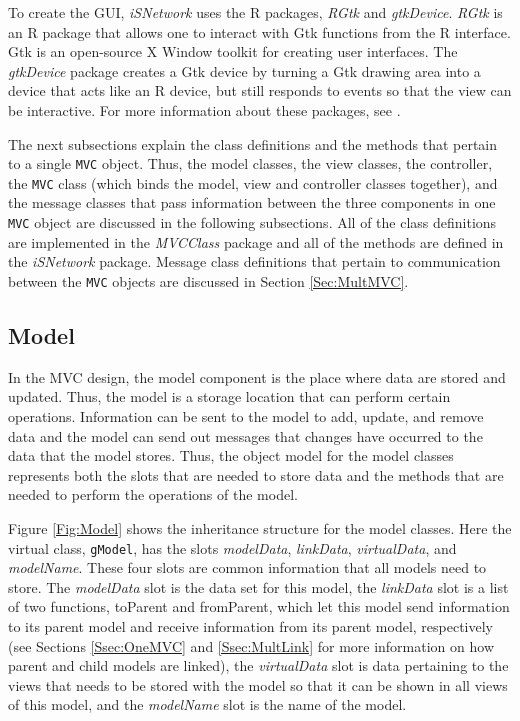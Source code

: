 \documentclass{article}[11pt]
\newcommand{\Rfunction}[1]{{\textsf{#1}}}
\newcommand{\Robject}[1]{{\texttt{#1}}}
\newcommand{\Rpackage}[1]{{\textit{#1}}}
\newcommand{\Rslot}[1]{\textsl{#1}}
\newcommand{\Rclass}[1]{\texttt{#1}}
\begin{document}
To create the GUI, \Rpackage{iSNetwork} uses the R packages,
\Rpackage{RGtk} and \Rpackage{gtkDevice}.  \Rpackage{RGtk} is an R package
that allows one to interact with Gtk functions from the R interface.  Gtk is
an open-source X Window toolkit \cite{Gtk} for creating user interfaces.  The
\Rpackage{gtkDevice} package creates a Gtk device by turning a Gtk drawing
area into a device that acts like an R device, but still responds to events so
that the view can be interactive.  For more information about these packages,
see \cite{EW05}.  

The next subsections explain the class definitions and the methods that
pertain to a single \Robject{MVC} object.  Thus, the model classes,
the view classes, the controller, the \Rclass{MVC} class
(which binds the model, view and controller classes
together), and the message classes that pass information between the
three components in one \Robject{MVC} object are discussed in the following
subsections.  All of the class definitions are implemented in the
\Rpackage{MVCClass} package and all of the methods are defined in the
\Rpackage{iSNetwork} package.  Message class definitions that pertain
to communication between the \Robject{MVC} objects are discussed in Section
\ref{Sec:MultMVC}. 

\subsection{Model}\label{Ssec:OneModel}

In the MVC design, the model component is the place where data are stored and
updated.  Thus, the model is a storage location that can perform certain
operations.  Information can be sent to the model to add, update, and remove
data and the model can send out messages that changes have occurred to the
data that the model stores.  Thus, the object model for the model
classes represents both the slots that are needed to store data and the
methods that are needed to perform the operations of the model. 

Figure \ref{Fig:Model} shows the inheritance structure for the model
classes. Here the virtual class, \Rclass{gModel}, has the slots
\Rslot{modelData}, \Rslot{linkData}, \Rslot{virtualData}, and
\Rslot{modelName}.  These four slots are common information that all models
need to store.  The \Rslot{modelData} slot is the data set for this model, the
\Rslot{linkData} slot is a list of two functions, \Rfunction{toParent} and
\Rfunction{fromParent}, which let this model send information to its parent
model and receive information from its parent model, respectively (see
Sections \ref{Ssec:OneMVC} and \ref{Ssec:MultLink} for more information on how
parent and child models are linked), the \Rslot{virtualData} slot is data
pertaining to the views that needs to be stored with the model so that it can
be shown in all views of this model, and the \Rslot{modelName} slot is the
name of the model. 
\end{document}
